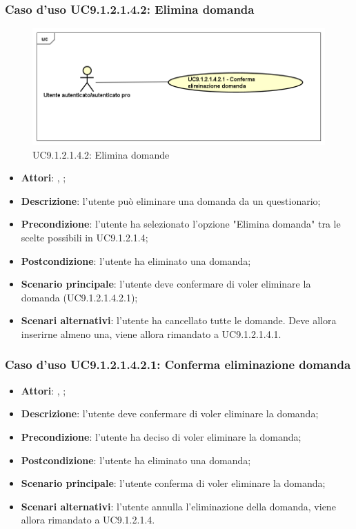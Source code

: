 						\subsubsection{Caso d'uso UC9.1.2.1.4.2: Elimina domanda}
						\label{UC9.1.2.1.4.2}
						\begin{figure}[h]
							\centering
						\includegraphics[scale=0.5,keepaspectratio]{UML/UC9_1_2_1_4_2.png}
							\caption{UC9.1.2.1.4.2: Elimina domande}
						\end{figure}
						\FloatBarrier
						\begin{itemize}
							\item \textbf{Attori}: \uau, \uaupro;
							\item \textbf{Descrizione}: l'utente può eliminare una domanda da un questionario;
							\item \textbf{Precondizione}: l'utente ha selezionato l'opzione "Elimina domanda" tra le scelte possibili in UC9.1.2.1.4;
							\item \textbf{Postcondizione}: l'utente ha eliminato una domanda;
							\item \textbf{Scenario principale}: l'utente deve confermare di voler eliminare la domanda (UC9.1.2.1.4.2.1); 
							\item \textbf{Scenari alternativi}: l'utente ha cancellato tutte le domande. Deve allora inserirne almeno una, viene allora rimandato a UC9.1.2.1.4.1.
						\end{itemize}
						
							\subsubsection{Caso d'uso UC9.1.2.1.4.2.1: Conferma eliminazione domanda}
							\label{UC9.1.2.1.4.2.1}
							\begin{itemize}
								\item \textbf{Attori}: \uau, \uaupro;
								\item \textbf{Descrizione}: l'utente deve confermare di voler eliminare la domanda;
								\item \textbf{Precondizione}: l'utente ha deciso di voler eliminare la domanda;
								\item \textbf{Postcondizione}: l'utente ha eliminato una domanda;
								\item \textbf{Scenario principale}: l'utente conferma di voler eliminare la domanda;
								\item \textbf{Scenari alternativi}: l'utente annulla l'eliminazione della domanda, viene allora rimandato a UC9.1.2.1.4.
							\end{itemize}	
																
